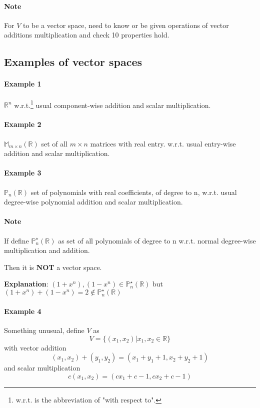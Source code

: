 \documentclass[11pt]{article}
\begin{document}
    \paragraph{Note} For $V$ to be a vector space, need to know or be given operations of vector additions multiplication and check  10 properties hold.
    \subsection{Examples of vector spaces}
    \paragraph{Example 1} $\mathbb{R}^n$ w.r.t.\footnote{w.r.t. is the abbreviation of "with respect to".} usual component-wise addition and scalar multiplication.
    \paragraph{Example 2} $\mathbb{M}_{m \times n}(\mathbb{R})$ set of all $m \times n$ matrices with real entry. w.r.t. usual entry-wise addition and scalar multiplication.
    \paragraph{Example 3} $\mathbb{P}_n(\mathbb{R})$ set of polynomials with real coefficients, of degree  to n, w.r.t. usual degree-wise polynomial addition and scalar multiplication.
    \paragraph{Note} If define $\mathbb{P}^\star_n (\mathbb{R})$ as set of all polynomials of degree  to n w.r.t. normal degree-wise multiplication and addition.
    
    Then it is \textbf{NOT} a vector space.
    
    \textbf{Explanation}: $(1 + x^n), (1 - x^n) \in \mathbb{P}^\star_n (\mathbb{R})$ but $(1 + x^n) + (1 - x^n) = 2 \notin \mathbb{P}^\star_n (\mathbb{R}) $
    \paragraph{Example 4} Something unusual, define $V$ as
    \[
    V = \{(x_1, x_2)\vert x_1, x_2 \in \mathbb{R}\}
    \] with vector addition
    \[
    (x_1, x_2) + (y_1, y_2) = (x_1 + y_1 + 1, x_2 + y_2 + 1)
    \]
    and scalar multiplication
    \[
    c (x_1, x_2) = (c x_1 + c - 1, c x_2 + c -1)
    \]
    
\end{document}
